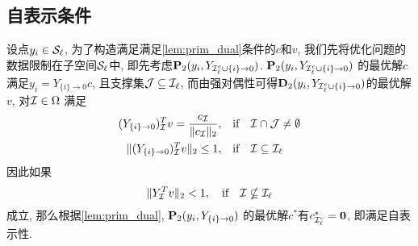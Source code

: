 \subsection{自表示条件}
设点$y_i\in\mathcal{S}_\ell$, 为了构造满足满足\autoref{lem:prim_dual}条件的$c$和$v$,
我们先将优化问题的数据限制在子空间$\mathcal{S}_\ell$中,
即先考虑$\mathbf{P}_2(y_i, Y_{\mathcal{I}_\ell^c\cup \{i\}\rightarrow 0})$.
$\mathbf{P}_2(y_i, Y_{\mathcal{I}_\ell^c\cup \{i\}\rightarrow 0})$
的最优解$c$满足$y_i=Y_{\{i\}\rightarrow 0}c$, 且支撑集$\mathcal{J} \subseteq \mathcal{I}_\ell$,
而由强对偶性可得$\mathbf{D}_2(y_i, Y_{\mathcal{I}_\ell^c\cup \{i\}\rightarrow 0})$的最优解$v$,
对$ \mathcal{I}\in \Omega$ 满足
\begin{align*}
  (Y_{\{i\}\rightarrow 0})^T_{\mathcal{I}} v = \frac{c_{\mathcal{I}}}{\|c_{\mathcal{I}}\|_2}, \quad&
  \text{if}\quad\mathcal{I} \cap \mathcal{J} \neq \emptyset \\
  \|(Y_{\{i\}\rightarrow 0})^T_{\mathcal{I}} v\|_2 \le 1, \quad&
  \text{if} \quad \mathcal{I} \subseteq \mathcal{I}_\ell 
\end{align*}
因此如果
\begin{equation} \label{eq:group_cond1}
  \|Y_{\mathcal{I}}^T v\|_2<1, \quad \text{if} \quad\mathcal{I} \nsubseteq \mathcal{I}_\ell
\end{equation}
成立, 那么根据\autoref{lem:prim_dual}, $\mathbf{P}_2(y_i, Y_{\{i\}\rightarrow 0})$
的最优解$c^*$有$c^*_{\mathcal{I}_\ell^c}=\mathbf{0}$, 即满足自表示性.

